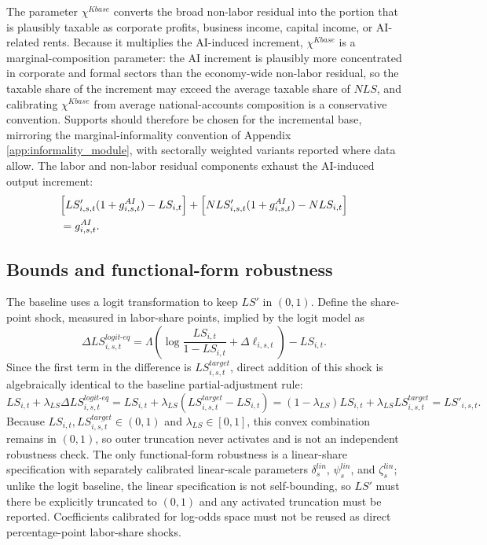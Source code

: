 \documentclass[11pt,a4paper]{article}
\begin{document}
The parameter $\chi^{Kbase}$ converts the broad non-labor residual into the portion that is plausibly taxable as corporate profits, business income, capital income, or AI-related rents. Because it multiplies the AI-induced increment, $\chi^{Kbase}$ is a marginal-composition parameter: the AI increment is plausibly more concentrated in corporate and formal sectors than the economy-wide non-labor residual, so the taxable share of the increment may exceed the average taxable share of $NLS$, and calibrating $\chi^{Kbase}$ from average national-accounts composition is a conservative convention. Supports should therefore be chosen for the incremental base, mirroring the marginal-informality convention of Appendix \ref{app:informality_module}, with sectorally weighted variants reported where data allow. The labor and non-labor residual components exhaust the AI-induced output increment:
\begin{equation}
\begin{split}
    &\Bigl[LS'_{i,s,t}(1+g^{AI}_{i,s,t})-LS_{i,t}\Bigr]
    +\Bigl[NLS'_{i,s,t}(1+g^{AI}_{i,s,t})-NLS_{i,t}\Bigr] \\
    &=g^{AI}_{i,s,t}.
\end{split}
\end{equation}

\subsection{Bounds and functional-form robustness}

The baseline uses a logit transformation to keep $LS'$ in $(0,1)$. Define the share-point shock, measured in labor-share points, implied by the logit model as
\begin{equation}
    \Delta LS^{logit\text{-}eq}_{i,s,t}
    =\Lambda\left(\log\frac{LS_{i,t}}{1-LS_{i,t}}+\Delta\ell_{i,s,t}\right)-LS_{i,t}.
\end{equation}
Since the first term in the difference is $LS^{target}_{i,s,t}$, direct addition of this shock is algebraically identical to the baseline partial-adjustment rule:
\begin{equation}
    LS_{i,t}+\lambda_{LS}\Delta LS^{logit\text{-}eq}_{i,s,t}
    =LS_{i,t}+\lambda_{LS}(LS^{target}_{i,s,t}-LS_{i,t})
    =(1-\lambda_{LS})LS_{i,t}+\lambda_{LS}LS^{target}_{i,s,t}
    =LS'_{i,s,t}.
\end{equation}
Because $LS_{i,t},LS^{target}_{i,s,t}\in(0,1)$ and $\lambda_{LS}\in[0,1]$, this convex combination remains in $(0,1)$, so outer truncation never activates and is not an independent robustness check. The only functional-form robustness is a linear-share specification with separately calibrated linear-scale parameters $\delta^{lin}_s$, $\psi^{lin}_s$, and $\zeta^{lin}_s$; unlike the logit baseline, the linear specification is not self-bounding, so $LS'$ must there be explicitly truncated to $(0,1)$ and any activated truncation must be reported. Coefficients calibrated for log-odds space must not be reused as direct percentage-point labor-share shocks.
\end{document}
